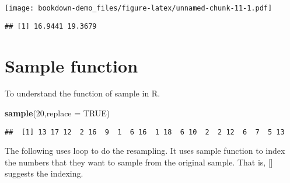 \documentclass[]{book}
\newenvironment{Shaded}{\begin{snugshade}}{\end{snugshade}}
\newcommand{\ControlFlowTok}[1]{\textcolor[rgb]{0.13,0.29,0.53}{\textbf{#1}}}
\newcommand{\DataTypeTok}[1]{\textcolor[rgb]{0.13,0.29,0.53}{#1}}
\newcommand{\DecValTok}[1]{\textcolor[rgb]{0.00,0.00,0.81}{#1}}
\newcommand{\KeywordTok}[1]{\textcolor[rgb]{0.13,0.29,0.53}{\textbf{#1}}}
\newcommand{\NormalTok}[1]{#1}
\newcommand{\OperatorTok}[1]{\textcolor[rgb]{0.81,0.36,0.00}{\textbf{#1}}}
\newcommand{\OtherTok}[1]{\textcolor[rgb]{0.56,0.35,0.01}{#1}}
\newcommand{\StringTok}[1]{\textcolor[rgb]{0.31,0.60,0.02}{#1}}
\begin{document}
\texttt{[image: bookdown-demo\_files/figure-latex/unnamed-chunk-11-1.pdf]}

\begin{verbatim}
## [1] 16.9441 19.3679
\end{verbatim}

\hypertarget{sample-function}{%
\section{Sample function}\label{sample-function}}

To understand the function of sample in R.

\begin{Shaded}
\begin{Highlighting}[]
\KeywordTok{sample}\NormalTok{(}\DecValTok{20}\NormalTok{,}\DataTypeTok{replace =} \OtherTok{TRUE}\NormalTok{)}
\end{Highlighting}
\end{Shaded}

\begin{verbatim}
##  [1] 13 17 12  2 16  9  1  6 16  1 18  6 10  2  2 12  6  7  5 13
\end{verbatim}

The following uses loop to do the resampling. It uses sample function to index the numbers that they want to sample from the original sample. That is, {[}{]} suggests the indexing.

\begin{Shaded}
\end{Shaded}
\end{document}
